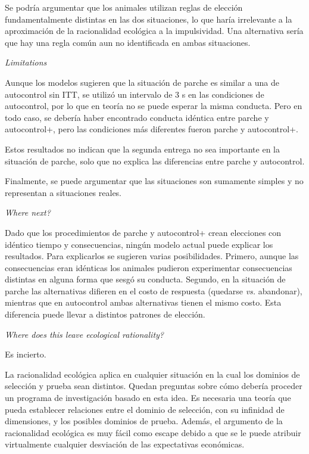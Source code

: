 \documentclass[a4paper,12pt]{article}
\begin{document}
Se podría argumentar que los animales utilizan reglas de elección fundamentalmente distintas en las dos situaciones, lo que haría irrelevante a la aproximación de la racionalidad ecológica a la impulsividad. Una alternativa sería que hay una regla común aun no identificada en ambas situaciones.

{\itshape Limitations}

Aunque los modelos sugieren que la situación de parche es similar a una de autocontrol sin ITT, se utilizó un intervalo de 3 s en las condiciones de autocontrol, por lo que en teoría no se puede esperar la misma conducta. Pero en todo caso, se debería haber encontrado conducta idéntica entre parche y autocontrol+, pero las condiciones más diferentes fueron parche y autocontrol+.

Estos resultados no indican que la segunda entrega no sea importante en la situación de parche, solo que no explica las diferencias entre parche y autocontrol.

Finalmente, se puede argumentar que las situaciones son sumamente simples y no representan a situaciones reales.

{\itshape Where next?}

Dado que los procedimientos de parche y autocontrol+ crean elecciones con idéntico tiempo y consecuencias, ningún modelo actual puede explicar los resultados. Para explicarlos se sugieren varias posibilidades. Primero, aunque las consecuencias eran idénticas los animales pudieron experimentar consecuencias distintas en alguna forma que sesgó su conducta. Segundo, en la situación de parche las alternativas difieren en el costo de respuesta (quedarse {\itshape vs.} abandonar), mientras que en autocontrol ambas alternativas tienen el mismo costo. Esta diferencia puede llevar a distintos patrones de elección.

{\itshape Where does this leave ecological rationality?}

Es incierto.

La racionalidad ecológica aplica en cualquier situación en la cual los dominios de selección y prueba sean distintos. Quedan preguntas sobre cómo debería proceder un programa de investigación basado en esta idea. Es necesaria una teoría que pueda establecer relaciones entre el dominio de selección, con su infinidad de dimensiones, y los posibles dominios de prueba. Además, el argumento de la racionalidad ecológica es muy fácil como escape debido a que se le puede atribuir virtualmente cualquier desviación de las expectativas económicas.
\end{document}
